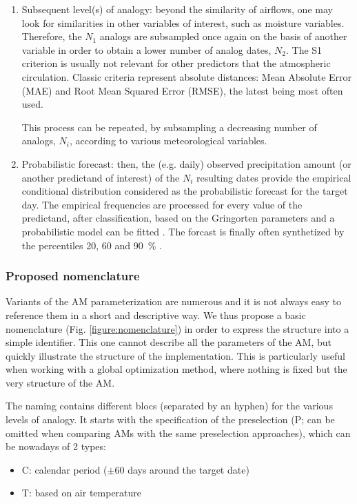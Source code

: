 \documentclass[review]{elsarticle}
\begin{document}
\begin{enumerate}
	\item Subsequent level(s) of analogy: beyond the similarity of airflows, one may look for similarities in other variables of interest, such as moisture variables. Therefore, the $N_{1}$ analogs are subsampled once again on the basis of another variable in order to obtain a lower number of analog dates, $N_{2}$. The S1 criterion is usually not relevant for other predictors that the atmospheric circulation. Classic criteria represent absolute distances: Mean Absolute Error (MAE) and Root Mean Squared Error (RMSE), the latest being most often used.
	
	This process can be repeated, by subsampling a decreasing number of analogs, $N_{i}$, according to various meteorological variables.
	
	\item Probabilistic forecast: then, the (e.g. daily) observed precipitation amount (or another predictand of interest) of the $N_{i}$ resulting dates provide the empirical conditional distribution considered as the probabilistic forecast for the target day. The empirical frequencies are processed for every value of the predictand, after classification, based on the Gringorten parameters \cite[for a Gumbel or exponential law; see][]{Gringorten1963} and a probabilistic model can be fitted \citep[e.g. Gamma function,][]{Obled2002}. The forcast is finally often synthetized by the percentiles 20, 60 and 90~\% \citep{Guilbaud1997, Guilbaud1998}.
	
\end{enumerate}


\subsubsection{Proposed nomenclature}

Variants of the AM parameterization are numerous and it is not always easy to reference them in a short and descriptive way. We thus propose a basic nomenclature (Fig. \ref{figure:nomenclature}) in order to express the structure into a simple identifier. This one cannot describe all the parameters of the AM, but quickly illustrate the structure of the implementation. This is particularly useful when working with a global optimization method, where nothing is fixed but the very structure of the AM.

The naming contains different blocs (separated by an hyphen) for the various levels of analogy. It starts with the specification of the preselection (P; can be omitted when comparing AMs with the same preselection approaches), which can be nowadays of 2 types:
\begin{itemize}
	\setlength\itemsep{-2px}
	\item C: calendar period ($\pm 60$ days around the target date)
	\item T: based on air temperature \citep{BenDaoud2010}
\end{itemize}
\end{document}

